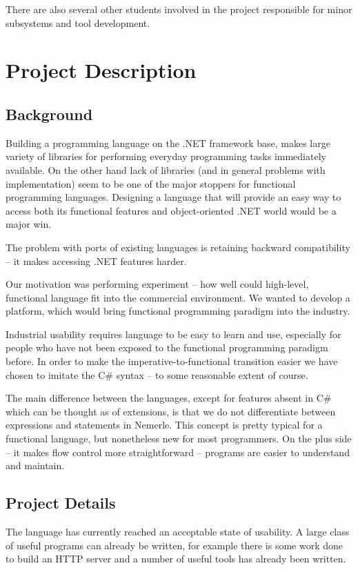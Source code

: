 \documentclass[a4paper,11pt]{article}
\begin{document}
There are also several other students involved in the project
responsible for minor subsystems and tool development.


\section{Project Description}

\subsection{Background}
Building a programming language on the .NET framework base, makes large
variety of libraries for performing everyday programming tasks immediately
available. On the other hand lack of libraries (and in general problems
with implementation) seem to be one of the major stoppers for functional
programming languages. Designing a language that will provide an easy way
to access both its functional features and object-oriented .NET world
would be a major win.

The problem with ports of existing languages is retaining backward
compatibility -- it makes accessing .NET features harder.

Our motivation was performing experiment -- how well could high-level,
functional language fit into the commercial environment. We wanted to
develop a platform, which would bring functional programming paradigm
into the industry.

Industrial usability requires language to be easy to learn and
use, especially for people who have not been exposed to the
functional programming paradigm before.  In order to make the
imperative-to-functional transition easier we have chosen to imitate
the C\# syntax -- to some reasonable extent of course.

The main difference between the languages, except for features absent
in C\# which can be thought as of extensions, is that we do not
differentiate between expressions and statements in Nemerle. This
concept is pretty typical for a functional language, but nonetheless
new for most programmers.  On the plus side -- it makes flow control
more straightforward -- programs are easier to understand and maintain.


\subsection{Project Details}

The language has currently reached an acceptable state of usability.
A large class of useful programs can already be written, for example
there is some work done to build an HTTP server and a number of
useful tools has already been written.
\end{document}
